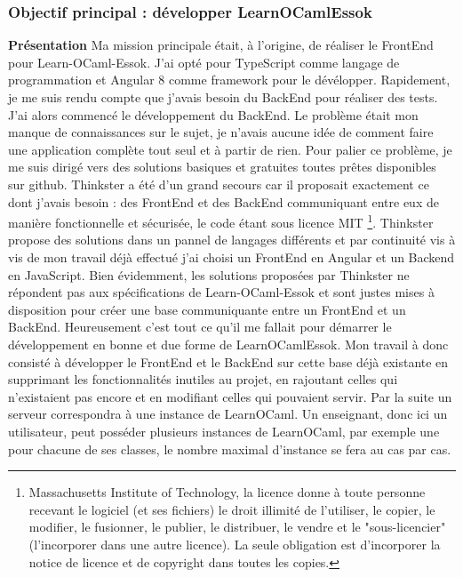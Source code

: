 \documentclass{article}
\begin{document}
\subsubsection{Objectif principal : développer LearnOCamlEssok}
\textbf{Présentation}
\newline
\newline
Ma mission principale était, à l'origine, de réaliser le FrontEnd pour Learn-OCaml-Essok.
J'ai opté pour TypeScript comme langage de programmation et Angular 8 comme framework pour le dévélopper.
\newline
\newline
Rapidement, je me suis rendu compte que j'avais besoin du BackEnd pour réaliser des tests. J'ai alors commencé le développement du BackEnd.
Le problème était mon manque de connaissances sur le sujet, je n'avais aucune idée de comment faire une application complète tout seul et à partir de rien. Pour palier ce problème, je me suis dirigé vers des solutions basiques et gratuites toutes prêtes disponibles sur github.
\newline
\newline
Thinkster a été d'un grand secours car il proposait exactement ce dont j'avais besoin : des FrontEnd et des BackEnd communiquant entre eux de manière fonctionnelle et sécurisée, le code étant sous licence MIT \footnote{\label{MIT} Massachusetts Institute of Technology, la licence donne à toute personne recevant le logiciel (et ses fichiers) le droit illimité de l'utiliser, le copier, le modifier, le fusionner, le publier, le distribuer, le vendre et le "sous-licencier" (l'incorporer dans une autre licence). La seule obligation est d'incorporer la notice de licence et de copyright dans toutes les copies.}.
\newline
Thinkster propose des solutions dans un pannel de langages différents et par continuité vis à vis de mon travail déjà effectué j'ai choisi un FrontEnd en Angular et un Backend en JavaScript.
\newline
\newline
Bien évidemment, les solutions proposées par Thinkster ne répondent pas aux spécifications de Learn-OCaml-Essok et sont justes mises à disposition pour créer une base communiquante entre un FrontEnd et un BackEnd. Heureusement c'est tout ce qu'il me fallait pour démarrer le développement en bonne et due forme de LearnOCamlEssok.
\newline
Mon travail à donc consisté à développer le FrontEnd et le BackEnd sur cette base déjà existante en supprimant les fonctionnalités inutiles au projet, en rajoutant celles qui n'existaient pas encore et en modifiant celles qui pouvaient servir.
\newline
\newline
Par la suite un serveur correspondra à une instance de LearnOCaml. Un enseignant, donc ici un utilisateur, peut posséder plusieurs instances de LearnOCaml, par exemple une pour chacune de ses classes, le nombre maximal d'instance se fera au cas par cas.
\newpage
\end{document}
